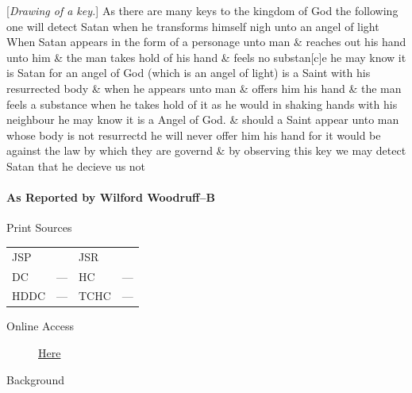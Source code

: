 					[\textit{Drawing of a key.}] As there are many keys to the kingdom of God the following one will detect Satan when he transforms himself nigh unto an angel of light When Satan appears in the form of a personage unto man \& reaches out his hand unto him \& the man takes hold of his hand \& feels no substan[c]e he may know it is Satan for an angel of God (which is an angel of light) is a Saint with his resurrected body \& when he appears unto man \& offers him his hand \& the man feels a substance when he takes hold of it as he would in shaking hands with his neighbour he may know it is a Angel of God. \& should a Saint appear unto man whose body is not resurrectd he will never offer him his hand for it would be against the law by which they are governd \& by observing this key we may detect Satan that he decieve us not
				
			\paragraph{As Reported by Wilford Woodruff--B}
				\label{EMS-1839-JS-27-JUN-1839-WW-B}
				
				\begin{description}
					\item[Print Sources]
				\end{description}

					\begin{tabular}{p{0.5in}p{1in}p{0.5in}p{1in}}
					JSP	 	& 			& JSR 		&  \\
					DC	 	& ---		& HC 		& --- \\
					HDDC 	& ---		& TCHC 		& --- \\
					\end{tabular}
				
				\begin{description}
					\item[Online Access] \href{https://www.josephsmithpapers.org/paper-summary/discourse-27-june-1839-as-reported-by-wilford-woodruff-b/1}{Here}
				\end{description}
				
				\begin{description}
					\item[Background]
				\end{description}
				
				
